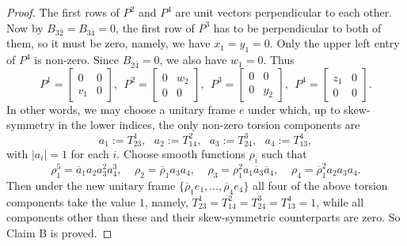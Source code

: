 \documentclass{amsart}
\begin{document}
\begin{proof}
The first rows of $P^2$ and $P^4$ are unit vectors perpendicular to each other. Now by $B_{3\bar{2}}=B_{3\bar{4}}=0$,  the first row of $P^3$ has to be perpendicular to both of them, so it must be zero, namely, we have $x_1=y_1=0$. Only the upper left entry of $P^4$ is non-zero. Since $B_{2\bar{4}}=0$, we also have $w_1=0$. Thus
$$ P^1 = \left[ \begin{array}{cc} 0 & 0 \\ v_1 & 0 \end{array} \right], \ \ P^2 = \left[ \begin{array}{cc} 0 & w_2 \\ 0 & 0 \end{array} \right],\ \  P^3 = \left[ \begin{array}{cc} 0 & 0 \\ 0 & y_2 \end{array} \right], \ \ P^4 = \left[ \begin{array}{cc} z_1 & 0 \\ 0 & 0 \end{array} \right]. $$
In other words, we may choose a unitary frame $e$ under which, up to skew-symmetry in the lower indices, the only non-zero torsion components are
$$ a_1:=T^1_{23}, \ \ \ a_2:=T^2_{14}, \ \ \ a_3:=T^3_{24}, \ \ \ a_4:=T^4_{13}, $$
with $|a_i|=1$ for each $i$. Choose smooth functions $\rho_i$ such that
$$  \rho_1^5=\overline{a}_1a_2a_3^2a_4^3, \ \ \ \ \ \rho_2=\overline{\rho}_1a_3a_4, \ \ \ \ \  \rho_3 = \rho_1^2 a_1\overline{a}_3\overline{a}_4, \ \ \ \ \ \rho_4 = \overline{\rho}_1^2a_2a_3a_4. $$
Then under the new unitary frame  $\{ \overline{\rho}_1e_1, \ldots , \overline{\rho}_4e_4\}$ all four of the above torsion components take the value $1$, namely, $T^1_{23}=T^2_{14}=T^3_{24}=T^4_{13}=1$, while all components other than these and their skew-symmetric counterparts are zero. So Claim B is proved.

\vspace{0.2cm}


\end{proof}
\end{document}

